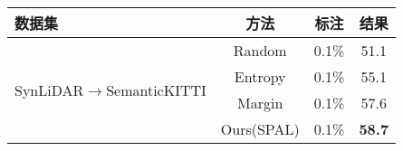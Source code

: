 \begin{table}[H]
	\renewcommand{\arraystretch}{1}
    \centering
    \setlength{\tabcolsep}{10mm}
    \label{tab:3-6}
    \wuhao
    \begin{tabular}{lccc}
        \toprule[1.5pt]
        \textbf{数据集} & \textbf{方法} & \textbf{标注} & \textbf{结果} \\
        \midrule
        \multirow{4}{*}{SynLiDAR\(\to\)SemanticKITTI}
        & Random              & 0.1\%        & 51.1 \\
        ~ & Entropy             & 0.1\%        & 55.1 \\
        ~ & Margin              & 0.1\%        & 57.6 \\
        ~ & Ours(SPAL)          & 0.1\%        & \textbf{58.7} \\
        \bottomrule[1.5pt]
    \end{tabular}
\end{table}